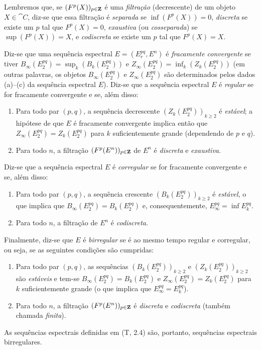 \begin{env}[11.1.3]
\label{0.11.1.3}
Lembremos que, se $(F^p(X))_{p\in\mathbf{Z}}$ é uma \emph{filtração} (decrescente) de um objeto $X\in\cat{C}$, diz-se que essa filtração é \emph{separada} se $\inf(F^p(X))=0$, \emph{discreta} se existe um $p$ tal que $F^p(X)=0$, \emph{exaustiva} (ou \emph{cosseparada}) se $\sup(F^p(X))=X$, e \emph{codiscreta} se existe um $p$ tal que $F^p(X)=X$.

Diz-se que uma sequência espectral $E=(E_r^{pq},E^n)$ é \emph{fracamente convergente} se tiver $B_\infty(E_2^{pq})=\sup_k(B_k(E_2^{pq}))$ e $Z_\infty(E_2^{pq})=\inf_k(Z_k(E_2^{pq}))$ (em outras palavras, os objetos $B_\infty(E_2^{pq})$ e $Z_\infty(E_2^{pq})$ são determinados pelos dados (a)--(c) da sequência espectral $E$).
Diz-se que a sequência espectral $E$ é \emph{regular} se for fracamente convergente e se, além disso:
\begin{enumerate}
  \item[(1st) ] Para todo par $(p,q)$, a sequência decrescente $(Z_k(E_2^{pq}))_{k\geq 2}$ é \emph{estável}; a hipótese de que $E$ é fracamente convergente implica então que $Z_\infty(E_2^{pq})=Z_k(E_2^{pq})$ para $k$ suficientemente grande (dependendo de $p$ e $q$).
  \item[(2nd) ] Para todo $n$, a filtração $(F^p(E^n))_{p\in\mathbf{Z}}$ de $E^n$ é \emph{discreta} e \emph{exaustiva}.
\end{enumerate}

Diz-se que a sequência espectral $E$ é \emph{corregular} se for fracamente convergente e se, além disso:
\begin{enumerate}
  \item[(3rd) ] Para todo par $(p,q)$, a sequência crescente $(B_k(E_2^{pq}))_{k\geq 2}$ é \emph{estável}, o que implica que $B_\infty(E_2^{pq})=B_k(E_2^{pq})$ e, consequentemente, $E_\infty^{pq}=\inf E_k^{pq}$.
  \item[(4th) ] Para todo $n$, a filtração de $E^n$ é \emph{codiscreta}.
\end{enumerate}

Finalmente, diz-se que $E$ é \emph{birregular} se é ao mesmo tempo regular e corregular, ou seja, se as seguintes condições são cumpridas:
\begin{enumerate}
  \item[(a) ] Para todo par $(p,q)$, as sequências $(B_k(E_2^{pq}))_{k\geq 2}$ e $(Z_k(E_2^{pq}))_{k\geq 2}$ são \emph{estáveis} e tem-se $B_\infty(E_2^{pq})=B_k(E_2^{pq})$ e $Z_\infty(E_2^{pq})=Z_k(E_2^{pq})$ para $k$ suficientemente grande (o que implica que $E_\infty^{pq}=E_k^{pq}$).
  \item[(b)] Para todo $n$, a filtração $(F^p(E^n))_{p\in\mathbf{Z}}$ é \emph{discreta} e \emph{codiscreta} (também chamada \emph{finita}).
\end{enumerate}

As sequências espectrais definidas em (T, 2.4) são, portanto, sequências espectrais birregulares.
\end{env}

